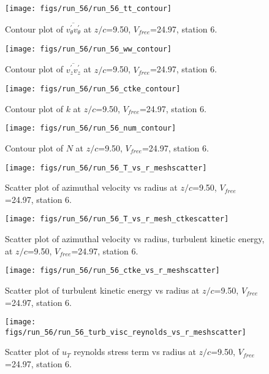 \begin{figure}[H]
\centering
\texttt{[image: figs/run\_56/run\_56\_tt\_contour]}
\caption{Contour plot of $\overline{v_{\theta}^{\prime} v_{\theta}^{\prime}}$ at $z/c$=9.50, $V_{free}$=24.97, station 6.}
\end{figure}


\begin{figure}[H]
\centering
\texttt{[image: figs/run\_56/run\_56\_ww\_contour]}
\caption{Contour plot of $\overline{v_{z}^{\prime} v_{z}^{\prime}}$ at $z/c$=9.50, $V_{free}$=24.97, station 6.}
\end{figure}


\begin{figure}[H]
\centering
\texttt{[image: figs/run\_56/run\_56\_ctke\_contour]}
\caption{Contour plot of $k$ at $z/c$=9.50, $V_{free}$=24.97, station 6.}
\end{figure}


\begin{figure}[H]
\centering
\texttt{[image: figs/run\_56/run\_56\_num\_contour]}
\caption{Contour plot of $N$ at $z/c$=9.50, $V_{free}$=24.97, station 6.}
\end{figure}


\begin{figure}[H]
\centering
\texttt{[image: figs/run\_56/run\_56\_T\_vs\_r\_meshscatter]}
\caption{Scatter plot of azimuthal velocity vs radius at $z/c$=9.50, $V_{free}$=24.97, station 6.}
\end{figure}


\begin{figure}[H]
\centering
\texttt{[image: figs/run\_56/run\_56\_T\_vs\_r\_mesh\_ctkescatter]}
\caption{Scatter plot of azimuthal velocity vs radius, turbulent kinetic energy, at $z/c$=9.50, $V_{free}$=24.97, station 6.}
\end{figure}


\begin{figure}[H]
\centering
\texttt{[image: figs/run\_56/run\_56\_ctke\_vs\_r\_meshscatter]}
\caption{Scatter plot of turbulent kinetic energy vs radius at $z/c$=9.50, $V_{free}$=24.97, station 6.}
\end{figure}


\begin{figure}[H]
\centering
\texttt{[image: figs/run\_56/run\_56\_turb\_visc\_reynolds\_vs\_r\_meshscatter]}
\caption{Scatter plot of $
u_T$ reynolds stress term vs radius at $z/c$=9.50, $V_{free}$=24.97, station 6.}
\end{figure}



